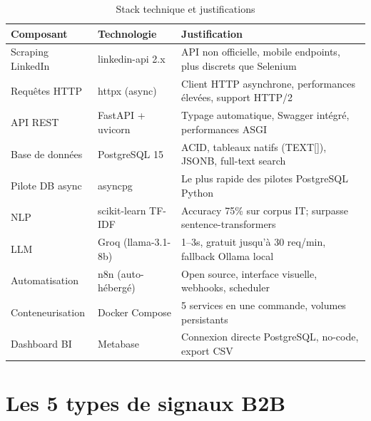 \begin{table}[H]
  \centering
  \begin{tabular}{L{3cm} L{3.5cm} L{6.5cm}}
    \toprule
    \textbf{Composant} & \textbf{Technologie} & \textbf{Justification} \\
    \midrule
    Scraping LinkedIn & linkedin-api 2.x & API non officielle, mobile endpoints, plus discrets que Selenium \\
    \addlinespace
    Requêtes HTTP & httpx (async) & Client HTTP asynchrone, performances élevées, support HTTP/2 \\
    \addlinespace
    API REST & FastAPI + uvicorn & Typage automatique, Swagger intégré, performances ASGI \\
    \addlinespace
    Base de données & PostgreSQL 15 & ACID, tableaux natifs (TEXT[]), JSONB, full-text search \\
    \addlinespace
    Pilote DB async & asyncpg & Le plus rapide des pilotes PostgreSQL Python \\
    \addlinespace
    NLP & scikit-learn TF-IDF & Accuracy 75\% sur corpus IT; surpasse sentence-transformers \\
    \addlinespace
    LLM & Groq (llama-3.1-8b) & 1--3s, gratuit jusqu'à 30 req/min, fallback Ollama local \\
    \addlinespace
    Automatisation & n8n (auto-hébergé) & Open source, interface visuelle, webhooks, scheduler \\
    \addlinespace
    Conteneurisation & Docker Compose & 5 services en une commande, volumes persistants \\
    \addlinespace
    Dashboard BI & Metabase & Connexion directe PostgreSQL, no-code, export CSV \\
    \bottomrule
  \end{tabular}
  \caption{Stack technique et justifications}
  \label{tab:stack}
\end{table}

\section{Les 5 types de signaux B2B}

